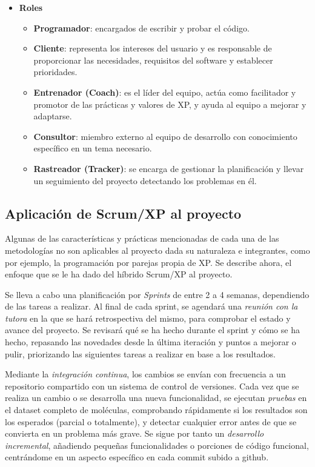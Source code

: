 \begin{itemize}
    \item \textbf{Roles}
    \begin{itemize}
        \item \textbf{Programador}: encargados de escribir y probar el código.
        \item \textbf{Cliente}: representa los intereses del usuario y es responsable de proporcionar las necesidades, requisitos del software y establecer prioridades. 
        \item \textbf{Entrenador (Coach)}: es el líder del equipo, actúa como facilitador y promotor de las prácticas y valores de XP, y ayuda al equipo a mejorar y adaptarse.
        \item \textbf{Consultor}: miembro externo al equipo de desarrollo con conocimiento específico en un tema necesario.
        \item \textbf{Rastreador (Tracker)}: se encarga de gestionar la planificación y llevar un seguimiento del proyecto detectando los problemas en él.
    \end{itemize}
\end{itemize}

\subsection{Aplicación de Scrum/XP al proyecto}

Algunas de las características y prácticas mencionadas de cada una de las metodologías no son aplicables al proyecto dada su naturaleza e integrantes, como por ejemplo, la programación por parejas propia de XP. Se describe ahora, el enfoque que se le ha dado del híbrido Scrum/XP al proyecto.

Se lleva a cabo una planificación por \emph{Sprints} de entre 2 a 4 semanas, dependiendo de las tareas a realizar. Al final de cada sprint, se agendará una \emph{reunión con la tutora} en la que se hará retrospectiva del mismo, para comprobar el estado y avance del proyecto. Se revisará qué se ha hecho durante el sprint y cómo se ha hecho, repasando las novedades desde la última iteración y puntos a mejorar o pulir, priorizando las siguientes tareas a realizar en base a los resultados.


Mediante la \emph{integración continua}, los cambios se envían con frecuencia a un repositorio compartido con un sistema de control de versiones. Cada vez que se realiza un cambio o se desarrolla una nueva funcionalidad, se ejecutan \emph{pruebas} en el dataset completo de moléculas, comprobando rápidamente si los resultados son los esperados (parcial o totalmente), y detectar cualquier error antes de que se convierta en un problema más grave. Se sigue por tanto un \emph{desarrollo incremental}, añadiendo pequeñas funcionalidades o porciones de código funcional, centrándome en un aspecto específico en cada commit subido a github.

